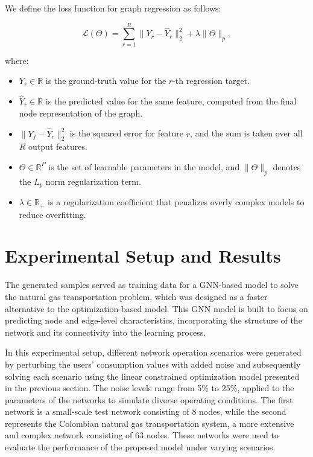 We define the loss function for graph regression as follows:

\begin{equation}
    \mathcal{L}(\Theta) = \sum_{r=1}^{R} \| Y_r - \hat{Y}_r \|^2_2 + \lambda \|\Theta\|_p,
\end{equation}

\noindent where:

\begin{itemize}
    \item \( Y_r \in \mathbb{R} \) is the ground-truth value for the \( r \)-th regression target.
    \item \( \hat{Y}_r \in \mathbb{R} \) is the predicted value for the same feature, computed from the final node representation of the graph.
    \item \( \| Y_f - \hat{Y}_r \|^2_2 \) is the squared error for feature \( r \), and the sum is taken over all \( R \) output features.
    \item \( \Theta \in \mathbb{R}^{P} \) is the set of learnable parameters in the model, and \( \|\Theta\|_p \) denotes the \( L_p \) norm regularization term.
    \item \( \lambda \in \mathbb{R}_+ \) is a regularization coefficient that penalizes overly complex models to reduce overfitting.
\end{itemize}




\section{Experimental Setup and Results} \label{sec:LinealCensnet_ExperimentalSetup}

The generated samples served as training data for a GNN-based model to solve the natural gas transportation problem, which was designed as a faster alternative to the optimization-based model. This GNN model is built to focus on predicting node and edge-level characteristics, incorporating the structure of the network and its connectivity into the learning process. 

In this experimental setup, different network operation scenarios were generated by perturbing the users' consumption values with added noise and subsequently solving each scenario using the linear constrained optimization model presented in the previous section. The noise levels range from 5\% to 25\%, applied to the parameters of the networks to simulate diverse operating conditions. The first network is a small-scale test network consisting of 8 nodes, while the second represents the Colombian natural gas transportation system, a more extensive and complex network consisting of 63 nodes. These networks were used to evaluate the performance of the proposed model under varying scenarios.

